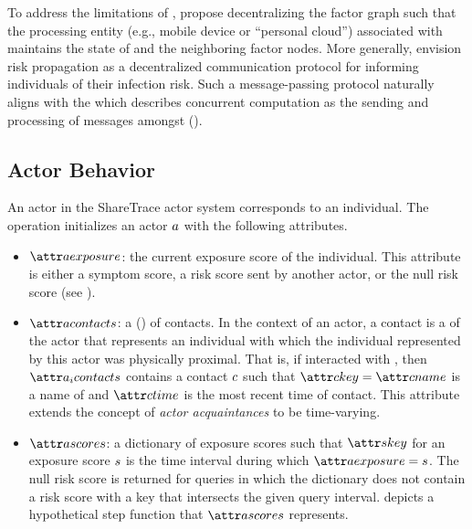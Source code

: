 To address the limitations of \cRiskPropagation{}, \citet{Ayday2021} propose decentralizing the factor graph such that the processing entity (e.g., mobile device or ``personal cloud'') associated with  maintains the state of  and the neighboring factor nodes. More generally, \citet{Ayday2021} envision risk propagation as a decentralized communication protocol for informing individuals of their infection risk. Such a message-passing protocol naturally aligns with the  which describes concurrent computation as the sending and processing of messages amongst  ().

\subsection{Actor Behavior}\label{sec:actor-behavior}

An actor in the ShareTrace actor system corresponds to an individual. The \cCreateActor{} operation \citep{Agha1985} initializes an actor $a$ with the following attributes.
\begin{itemize}
  \item $\aActorExposure$: the current exposure score of the individual. This attribute is either a symptom score, a risk score sent by another actor, or the null risk score (see \cNullRiskScore).
  \item $\aActorContacts$: a  () of contacts. In the context of an actor, a contact is a  \citep{Gamma1995} of the actor that represents an individual with which the individual represented by this actor was physically proximal. That is, if  interacted with , then $\aContacts{\vActor_i}$ contains a contact $c$ such that $\aContactKey = \aContactName$ is a name of  and $\aContactTime$ is the most recent time of contact. This attribute extends the concept of \emph{actor acquaintances} \citep{Hewitt1977a, Hewitt1977b, Agha1985} to be time-varying.
  \item $\aActorScores$: a dictionary of exposure scores such that $\aScoreKey$ for an exposure score $s$ is the time interval during which $\aActorExposure = \vScore$. The null risk score is returned for queries in which the dictionary does not contain a risk score with a key that intersects the given query interval.  depicts a hypothetical step function that $\aActorScores$ represents.
\end{itemize}

